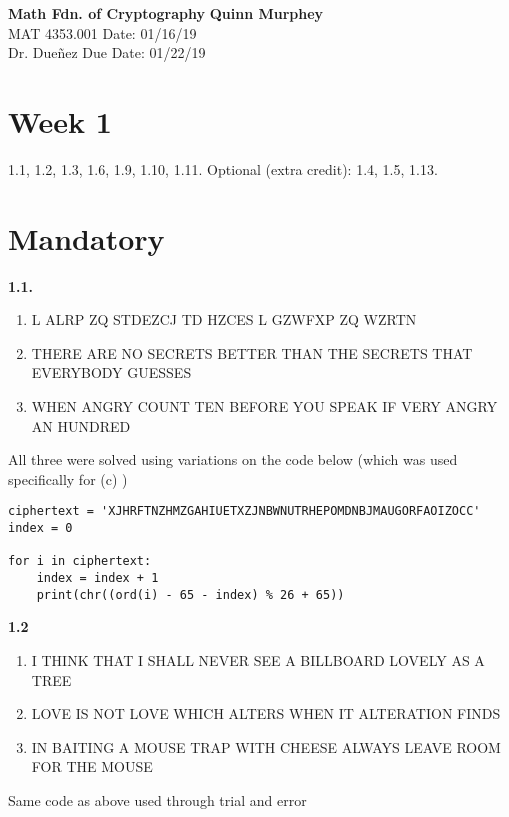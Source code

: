 \documentclass[a4paper, 11pt]{article}
\begin{document}
\noindent
\large\textbf{Math Fdn. of Cryptography} \hfill \textbf{Quinn Murphey} \\
\normalsize MAT 4353.001 \hfill Date: 01/16/19 \\
Dr. Dueñez \hfill Due Date: 01/22/19 \\
\noindent\makebox[\linewidth]{\rule{\paperwidth}{0.4pt}}
\section*{Week 1}
1.1, 1.2, 1.3, 1.6, 1.9, 1.10, 1.11. Optional (extra credit): 1.4, 1.5, 1.13.
\\
\section*{Mandatory}

\textbf{1.1.} 
\begin{enumerate}[label=(\alph*)]
    \item L ALRP ZQ STDEZCJ TD HZCES L GZWFXP ZQ WZRTN
    \item THERE ARE NO SECRETS BETTER THAN THE SECRETS THAT EVERYBODY GUESSES
    \item WHEN ANGRY COUNT TEN BEFORE YOU SPEAK IF VERY ANGRY AN HUNDRED
\end{enumerate}

\noindent All three were solved using variations on the code below (which was used specifically for (c) )

\begin{lstlisting}
ciphertext = 'XJHRFTNZHMZGAHIUETXZJNBWNUTRHEPOMDNBJMAUGORFAOIZOCC'
index = 0

for i in ciphertext:
    index = index + 1
    print(chr((ord(i) - 65 - index) % 26 + 65))
\end{lstlisting} 

\noindent \textbf{1.2}
\begin{enumerate}[label=(\alph*)]
    \item I THINK THAT I SHALL NEVER SEE A BILLBOARD LOVELY AS A TREE
    \item LOVE IS NOT LOVE WHICH ALTERS WHEN IT ALTERATION FINDS
    \item IN BAITING A MOUSE TRAP WITH CHEESE ALWAYS LEAVE ROOM FOR THE MOUSE
\end{enumerate}
Same code as above used through trial and error
\end{document}

